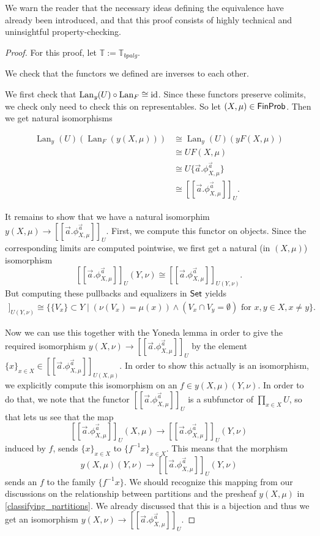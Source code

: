 \documentclass[a4paper]{amsproc}
\theoremstyle{plain}
\theoremstyle{definition}
\theoremstyle{remark}
\numberwithin{equation}{section}
\newcommand{\id}{\textup{id}}
\newcommand{\y}{\textit{y}}
\DeclareMathOperator{\Lan}{Lan}
\newcommand{\Set}{\textup{\textsf{Set}}}
\newcommand{\FinProb}{\textup{\textsf{FinProb}}}
\newcommand{\ldoub}{[\![}
\newcommand{\rdoub}{]\!]}
\begin{document}
We warn the reader that the necessary ideas defining the equivalence have already been introduced, and that this proof consists of highly technical and uninsightful property-checking.

\begin{proof}
For this proof, let $\mathbb{T} := \mathbb{T}_{bpalg}$.

We check that the functors we defined are inverses to each other.

We first check that $\Lan_{\y}(U) \circ \Lan_F \cong \id$. Since these functors preserve colimits, we check only need to check this on representables. So let $(X,\mu) \in \FinProb$. Then we get natural isomorphisms

\begin{align*}
\Lan_{\y}(U)(\Lan_F(\y(X,\mu))) &\cong \Lan_{\y}(U)(yF(X,\mu)) \\
&\cong UF(X,\mu) \\
&\cong U \{\vec{a} . \phi^{\vec{a}}_{X,\mu}\} \\
&\cong \ldoub \vec{a} . \phi^{\vec{a}}_{X,\mu} \rdoub_U .
\end{align*}

It remains to show that we have a natural isomorphim $\y (X,\mu) \to \ldoub \vec{a} . \phi^{\vec{a}}_{X,\mu} \rdoub_U$. First, we compute this functor on objects. Since the corresponding limits are computed pointwise, we first get a natural (in $(X,\mu)$) isomorphism
\[
\ldoub \vec{a} . \phi^{\vec{a}}_{X,\mu} \rdoub_U (Y,\nu) \cong \ldoub \vec{a} . \phi^{\vec{a}}_{X,\mu} \rdoub_{U(Y,\nu)} .
\]
But computing these pullbacks and equalizers in $\Set$ yields
\begin{align*}
\ldoub \vec{a} . \phi^{\vec{a}}_{X,\mu} \rdoub_{U(Y,\nu)} \cong
\{\{V_x\} \subset Y \mid (\nu(V_x) = \mu(x)) \wedge (V_x \cap V_y = \emptyset) \text{ for } x,y \in X, x \neq y\} .
\end{align*}

Now we can use this together with the Yoneda lemma in order to give the required isomorphism $\y (X,\nu) \to \ldoub \vec{a} . \phi^{\vec{a}}_{X,\mu} \rdoub_U$ by the element $\{x\}_{x \in X} \in \ldoub \vec{a} . \phi^{\vec{a}}_{X,\mu} \rdoub_{U(X,\mu)}$. In order to show this actually is an isomorphism, we explicitly compute this isomorphism on an $f \in \y (X,\mu) (Y,\nu)$. In order to do that, we note that the functor $\ldoub \vec{a} . \phi^{\vec{a}}_{X,\mu} \rdoub_U$ is a subfunctor of $\prod_{x \in X} U$, so that lets us see that the map
\[
\ldoub \vec{a} . \phi^{\vec{a}}_{X,\mu} \rdoub_U(X,\mu) \to \ldoub \vec{a} . \phi^{\vec{a}}_{X,\mu} \rdoub_U(Y,\nu)
\]
induced by $f$, sends $\{x\}_{x \in X}$ to $\{f^{-1} x\}_{x \in X}$. This means that the morphism
\[
\y (X,\mu) (Y,\nu) \to \ldoub \vec{a} . \phi^{\vec{a}}_{X,\mu} \rdoub_U(Y,\nu)
\]
sends an $f$ to the family $\{f^{-1} x\}$. We should recognize this mapping from our discussions on the relationship between partitions and the presheaf $\y (X,\mu)$ in \ref{classifying_partitions}. We already discussed that this is a bijection and thus we get an isomorphism $\y (X,\nu) \to \ldoub \vec{a} . \phi^{\vec{a}}_{X,\mu} \rdoub_U$.


\end{proof}
\end{document}
